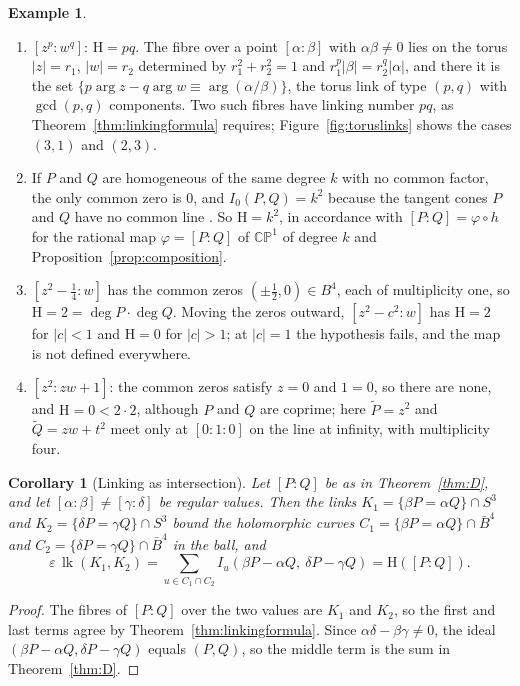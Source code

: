 \documentclass[11pt]{amsart}
\numberwithin{equation}{section}
\theoremstyle{plain}
\newtheorem{corollary}[theorem]{Corollary}
\theoremstyle{definition}
\newtheorem{example}[theorem]{Example}
\theoremstyle{remark}
\newcommand{\CP}{\mathbb{CP}}
\newcommand{\lk}{\operatorname{lk}}
\newcommand{\Hopf}{\mathrm{H}}
\begin{document}
\begin{example}\label{ex:holoexamples}
\begin{enumerate}[label=\textup{(\alph*)}]
\item $[z^p:w^q]$: $\Hopf=pq$. The fibre over a point $[\alpha:\beta]$ with $\alpha\beta\neq0$ lies on the torus $|z|=r_1$, $|w|=r_2$ determined by $r_1^2+r_2^2=1$ and $r_1^p|\beta|=r_2^q|\alpha|$, and there it is the set $\{p\arg z-q\arg w\equiv\arg(\alpha/\beta)\}$, the torus link of type $(p,q)$ with $\gcd(p,q)$ components. Two such fibres have linking number $pq$, as Theorem~\ref{thm:linkingformula} requires; Figure~\ref{fig:toruslinks} shows the cases $(3,1)$ and $(2,3)$.
\item If $P$ and $Q$ are homogeneous of the same degree $k$ with no common factor, the only common zero is $0$, and $I_0(P,Q)=k^2$ because the tangent cones $P$ and $Q$ have no common line \cite[Section~3.3]{Ful69}. So $\Hopf=k^2$, in accordance with $[P:Q]=\varphi\circ h$ for the rational map $\varphi=[P:Q]$ of $\CP^1$ of degree $k$ and Proposition~\ref{prop:composition}.
\item $[z^2-\tfrac14:w]$ has the common zeros $(\pm\tfrac12,0)\in B^4$, each of multiplicity one, so $\Hopf=2=\deg P\cdot\deg Q$. Moving the zeros outward, $[z^2-c^2:w]$ has $\Hopf=2$ for $|c|<1$ and $\Hopf=0$ for $|c|>1$; at $|c|=1$ the hypothesis fails, and the map is not defined everywhere.
\item $[z^2:zw+1]$: the common zeros satisfy $z=0$ and $1=0$, so there are none, and $\Hopf=0<2\cdot2$, although $P$ and $Q$ are coprime; here $\tilde P=z^2$ and $\tilde Q=zw+t^2$ meet only at $[0:1:0]$ on the line at infinity, with multiplicity four.
\end{enumerate}
\end{example}

\begin{corollary}[Linking as intersection]\label{cor:lkint}
Let $[P:Q]$ be as in Theorem~\ref{thm:D}, and let $[\alpha:\beta]\neq[\gamma:\delta]$ be regular values. Then the links $K_1=\{\beta P=\alpha Q\}\cap S^3$ and $K_2=\{\delta P=\gamma Q\}\cap S^3$ bound the holomorphic curves $C_1=\{\beta P=\alpha Q\}\cap\bar B^4$ and $C_2=\{\delta P=\gamma Q\}\cap\bar B^4$ in the ball, and
\[
\varepsilon\,\lk(K_1,K_2)=\sum_{u\in C_1\cap C_2}I_u(\beta P-\alpha Q,\ \delta P-\gamma Q)=\Hopf([P:Q]).
\]
\end{corollary}

\begin{proof}
The fibres of $[P:Q]$ over the two values are $K_1$ and $K_2$, so the first and last terms agree by Theorem~\ref{thm:linkingformula}. Since $\alpha\delta-\beta\gamma\neq0$, the ideal $(\beta P-\alpha Q,\delta P-\gamma Q)$ equals $(P,Q)$, so the middle term is the sum in Theorem~\ref{thm:D}.
\end{proof}
\end{document}
